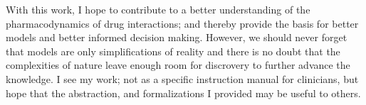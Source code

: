 
With this work, I hope to contribute to a better understanding of the pharmacodynamics of drug interactions; and thereby provide the basis for better models and better informed decision making.
However, we should never forget that models are only simplifications of reality and there is no doubt that the complexities of nature leave enough room for discrovery to further advance the knowledge.
I see my work; not as a specific instruction manual for clinicians, but hope that the abstraction, and formalizations I provided may be useful to others.
